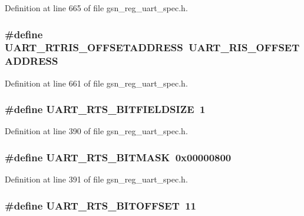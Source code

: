 Definition at line 665 of file gsn\_\-reg\_\-uart\_\-spec.h.

\hypertarget{a00575_ac121b1665e826f92ef0195c09203b5f6}{
\subsubsection[{UART\_\-RTRIS\_\-OFFSETADDRESS}]{\setlength{\rightskip}{0pt plus 5cm}\#define UART\_\-RTRIS\_\-OFFSETADDRESS~UART\_\-RIS\_\-OFFSETADDRESS}}
\label{a00575_ac121b1665e826f92ef0195c09203b5f6}


Definition at line 661 of file gsn\_\-reg\_\-uart\_\-spec.h.

\hypertarget{a00575_a307a6ed4b0a32b405cf8b7558a53a149}{
\subsubsection[{UART\_\-RTS\_\-BITFIELDSIZE}]{\setlength{\rightskip}{0pt plus 5cm}\#define UART\_\-RTS\_\-BITFIELDSIZE~1}}
\label{a00575_a307a6ed4b0a32b405cf8b7558a53a149}


Definition at line 390 of file gsn\_\-reg\_\-uart\_\-spec.h.

\hypertarget{a00575_a31fff3461634d59fdf487fccc0af3426}{
\subsubsection[{UART\_\-RTS\_\-BITMASK}]{\setlength{\rightskip}{0pt plus 5cm}\#define UART\_\-RTS\_\-BITMASK~0x00000800}}
\label{a00575_a31fff3461634d59fdf487fccc0af3426}


Definition at line 391 of file gsn\_\-reg\_\-uart\_\-spec.h.

\hypertarget{a00575_ac44c46c6c66089802eb7839a86c33799}{
\subsubsection[{UART\_\-RTS\_\-BITOFFSET}]{\setlength{\rightskip}{0pt plus 5cm}\#define UART\_\-RTS\_\-BITOFFSET~11}}
\label{a00575_ac44c46c6c66089802eb7839a86c33799}


